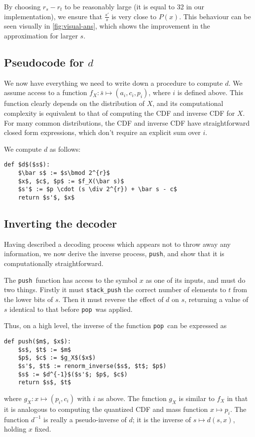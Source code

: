 \documentclass{article}
\theoremstyle{definition}
\newcommand{\push}{\texttt{push}}
\newcommand{\pop}{\texttt{pop}}
\begin{document}
By choosing \(r_s - r_t\) to be reasonably
large (it is equal to 32 in our implementation), we ensure that
\(\frac{s'}{s}\) is very close to \(P(x)\). This behaviour can be seen visually
in \cref{fig:visual-ans}, which shows the improvement in the approximation for
larger \(s\).

\subsection{Pseudocode for \(d\)}
We now have everything we need to write down a procedure to compute \(d\). We
assume access to a function \(f_X:\bar{s}\mapsto (a_i, c_i, p_i)\), where \(i\)
is defined above. This function clearly depends on the distribution of \(X\), and
its computational complexity is equivalent to that of computing the CDF and
inverse CDF for \(X\). For many common distributions, the CDF and inverse CDF
have straightforward closed form expressions, which don't require an explicit
sum over \(i\).

\pagebreak
We compute \(d\) as follows:
\begin{lstlisting}[frame=single]
def $d$($s$):
    $\bar s$ := $s\bmod 2^{r}$
    $x$, $c$, $p$ := $f_X(\bar s)$
    $s'$ := $p \cdot (s \div 2^{r}) + \bar s - c$
    return $s'$, $x$
\end{lstlisting}

\subsection{Inverting the decoder}
Having described a decoding process which appears not to throw away any
information, we now derive the inverse process, \push, and show that it is
computationally straightforward.

The \push\ function has access to the symbol \(x\) as one of its inputs, and
must do two things. Firstly it must \texttt{stack\_push} the correct number of
elements to \(t\) from the lower bits of \(s\). Then it must reverse the effect
of \(d\) on \(s\), returning a value of \(s\) identical to that before \pop\
was applied.

Thus, on a high level, the inverse of the function \pop\ can be expressed as
\begin{lstlisting}[frame=single]
def push($m$, $x$):
    $s$, $t$ := $m$
    $p$, $c$ := $g_X$($x$)
    $s'$, $t$ := renorm_inverse($s$, $t$; $p$)
    $s$ := $d^{-1}$($s'$; $p$, $c$)
    return $s$, $t$
\end{lstlisting}
where \(g_X:x\mapsto (p_i, c_i)\) with \(i\) as above. The function \(g_X\) is
similar to \(f_X\) in that it is analogous to computing the quantized CDF and
mass function \(x \mapsto p_i\).  The function \(d^{-1}\) is really a
pseudo-inverse of \(d\); it is the inverse of \(s\mapsto d(s, x)\), holding
\(x\) fixed.
\end{document}
